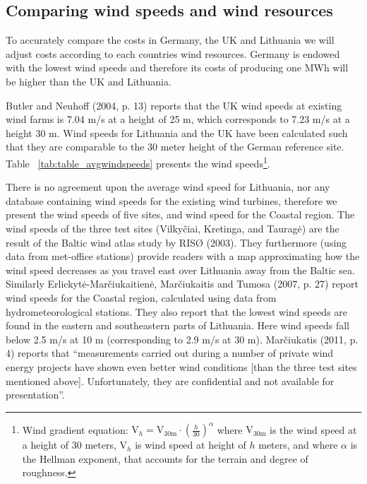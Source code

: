 \documentclass[a4paper, 12pt]{article}
\begin{document}
\subsection{Comparing wind speeds and wind resources}
To accurately compare the costs in Germany, the UK and Lithuania we will adjust costs according to each countries wind resources. Germany is endowed with the lowest wind speeds and therefore its costs of producing one MWh will be higher than the UK and Lithuania. 

Butler and Neuhoff (2004, p. 13) reports that the UK wind speeds at existing wind farms is 7.04 m/s at a height of 25 m, which corresponds to 7.23 m/s at a height 30 m. Wind speeds for Lithuania and the UK have been calculated such that they are comparable to the 30 meter height of the German reference site. Table ~\ref{tab:table_avgwindspeeds} presents the wind speeds\footnote{Wind gradient equation: $\text{V}_h = \text{V}_\text{30m} \cdot \left(\frac{h}{30}\right)^\alpha$ where $\text{V}_\text{30m}$ is the wind speed at a height of 30 meters, $\text{V}_h$ is wind speed at height of $h$ meters, and where  $\alpha$ is the Hellman exponent, that accounts for the terrain and degree of roughness.}.

There is no agreement upon the average wind speed for Lithuania, nor any database containing wind speeds for the existing wind turbines, therefore we present the wind speeds of five sites, and wind speed for the Coastal region. The wind speeds of the three test sites (Vilkyčiai, Kretinga, and Tauragė) are the result of the Baltic wind atlas study by RISØ (2003). They furthermore (using data from met-office stations) provide readers with a map approximating how the wind speed decreases as you travel east over Lithuania away from the Baltic sea. Similarly Erlickytė-Marčiukaitienė, Marčiukaitis and Tumosa (2007, p. 27) report wind speeds for the Coastal region, calculated using data from hydrometeorological stations. They also report that the lowest wind speeds are found in the eastern and southeastern parts of Lithuania. Here wind speeds fall below 2.5 m/s at 10 m (corresponding to 2.9 m/s at 30 m). Marčiukatis (2011, p. 4) reports that ``measurements carried out during a number of private wind energy projects have shown even better wind conditions [than the three test sites mentioned above]. Unfortunately, they are confidential and not available for presentation''.
\end{document}
